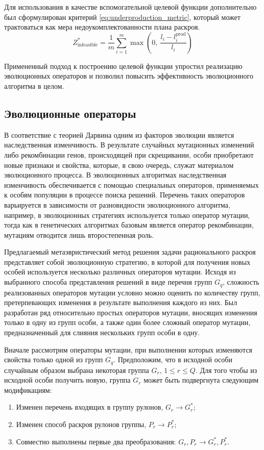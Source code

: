 \documentclass[12pt]{article}
\begin{document}
Для использования в качестве вспомогательной целевой функции дополнительно был 
сформулирован критерий 
\eqref{eq:underproduction_metric}, 
который может трактоваться как мера 
недоукомплектованности плана раскроя.
\begin{equation}\label{eq:underproduction_metric}
    Z_{\text{infeasible}}^{*}=\frac{1}{m} 
       \sum_{i=1}^{m} \max{\left( 0, \: \frac{l_i-l_i^{\text{prod}}}{l_i} \right)}
\end{equation}

Примененный подход к построению целевой функции упростил реализацию 
эволюционных операторов и позволил повысить эффективность эволюционного 
алгоритма в целом.

\subsection{Эволюционные операторы}

В соответствие с теорией Дарвина одним из факторов эволюции является 
наследственная изменчивость. В результате случайных мутационных изменений либо 
рекомбинации генов, происходящей при скрещивании, особи приобретают новые 
признаки и свойства, которые, в свою очередь, служат материалом эволюционного 
процесса. В эволюционных алгоритмах наследственная изменчивость обеспечивается 
с помощью специальных операторов, применяемых к особям популяции в процессе 
поиска решений. Перечень таких операторов варьируется в зависимости от 
разновидности эволюционного алгоритма, например, в эволюционных стратегиях 
используется только оператор мутации, тогда как в генетических алгоритмах 
базовым является оператор рекомбинации, мутациям отводится лишь второстепенная 
роль.

Предлагаемый метаэвристический метод решения задачи рационального раскроя 
представляет собой эволюционную стратегию, в которой для получения новых 
особей используется несколько различных операторов мутации. Исходя из 
выбранного способа представления решений в виде перечня групп $G_q$, сложность 
реализованных операторов мутации условно можно оценить по количеству групп, 
претерпевающих изменения в результате выполнения каждого из них. Был 
разработан ряд относительно простых операторов мутации, вносящих изменения 
только в одну из групп особи, а также один более сложный оператор мутации, 
предназначенный для слияния нескольких групп особи в одну.

Вначале рассмотрим операторы мутации, при выполнении которых изменяются 
свойства только одной из групп $G_q$. Предположим, что в исходной особи 
случайным образом выбрана некоторая группа $G_r$, $1 \leq r \leq Q$. Для того 
чтобы из исходной особи получить новую, группа $G_r$ может быть подвергнута 
следующим модификациям:
\begin{enumerate}
    \item Изменен перечень входящих в группу рулонов, $G_r \rightarrow G_r^*$;
    \item Изменен способ раскроя рулонов группы, $P_r \rightarrow P_r^*$;
    \item Совместно выполнены первые два преобразования: $
          G_r,P_r \rightarrow G_r^*,P_r^*$.
\end{enumerate}
\end{document}
